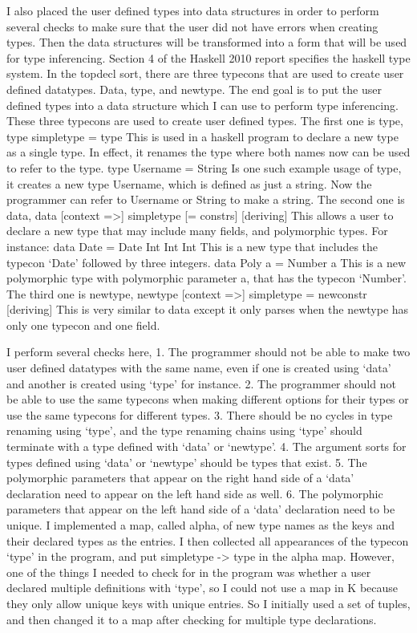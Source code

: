 I also placed the user defined types into data structures in order to perform several checks to make sure that the user did not have errors when creating types. Then the data structures will be transformed into a form that will be used for type inferencing.
Section 4 of the Haskell 2010 report specifies the haskell type system.
In the topdecl sort, there are three typecons that are used to create user defined datatypes. Data, type, and newtype. The end goal is to put the user defined types into a data structure which I can use to perform type inferencing. These three typecons are used to create user defined types.
The first one is type,
type simpletype = type 
This is used in a haskell program to declare a new type as a single type. In effect, it renames the type where both names now can be used to refer to the type.
type Username = String
Is one such example usage of type, it creates a new type Username, which is defined as just a string. Now the programmer can refer to Username or String to make a string.
	The second one is data,
data [context =>] simpletype [= constrs] [deriving]
This allows a user to declare a new type that may include many fields, and polymorphic types. For instance:
data Date = Date Int Int Int
This is a new type that includes the typecon ‘Date’ followed by three integers.
data Poly a = Number a
This is a new polymorphic type with polymorphic parameter a, that has the typecon ‘Number’.
	The third one is newtype,
newtype [context =>] simpletype = newconstr [deriving]
This is very similar to data except it only parses when the newtype has only one typecon and one field.

I perform several checks here, 
1. The programmer should not be able to make two user defined datatypes with the same name, even if one is created using ‘data’ and another is created using ‘type’ for instance.
2. The programmer should not be able to use the same typecons when making different options for their types or use the same typecons for different types.
3. There should be no cycles in type renaming using ‘type’, and the type renaming chains using ‘type’ should terminate with a type defined with ‘data’ or ‘newtype’.
4. The argument sorts for types defined using ‘data’ or ‘newtype’ should be types that exist.
5. The polymorphic parameters that appear on the right hand side of a ‘data’ declaration need to appear on the left hand side as well.
6. The polymorphic parameters that appear on the left hand side of a ‘data’ declaration need to be unique.
I implemented a map, called alpha, of new type names as the keys and their declared types as the entries. I then collected all appearances of the typecon ‘type’ in the program, and put simpletype -> type in the alpha map. However, one of the things I needed to check for in the program was whether a user declared multiple definitions with ‘type’, so I could not use a map in K because they only allow unique keys with unique entries. So I initially used a set of tuples, and then changed it to a map after checking for multiple type declarations.


